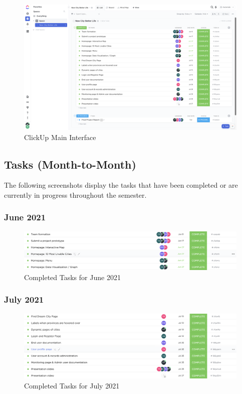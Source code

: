 \documentclass[12pt, letterpaper]{article}
\begin{document}
\begin{figure}[htbp]
	\centering
	\includegraphics[width=\textwidth]{images/29-clickup-main.png}
	\caption{ClickUp Main Interface}
\end{figure}

\newpage

\subsection*{Tasks (Month-to-Month)}
The following screenshots display the tasks that have been completed or are currently in progress throughout the semester.

\subsubsection*{June 2021}
\begin{figure}[htbp]
	\centering
	\includegraphics[width=\textwidth]{images/29-clickup-month1.png}
	\caption{Completed Tasks for June 2021}
\end{figure}

\subsubsection*{July 2021}
\begin{figure}[htbp]
	\centering
	\includegraphics[width=\textwidth]{images/29-clickup-month2.png}
	\caption{Completed Tasks for July 2021}
\end{figure}
\end{document}
